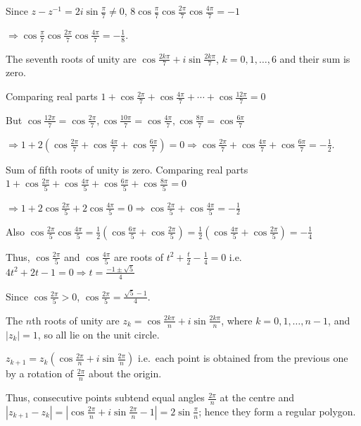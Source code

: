   Since $z - z^{-1} = 2i\sin\frac{\pi}{7}\neq 0$, $8\cos\frac{\pi}{7}\cos\frac{2\pi}{7}\cos\frac{4\pi}{7} =
  -1$

  $\Rightarrow \cos\frac{\pi}{7}\cos\frac{2\pi}{7}\cos\frac{4\pi}{7} = -\frac{1}{8}$.
\item The seventh roots of unity are $\cos\frac{2k\pi}{7} + i\sin\frac{2k\pi}{7}$, $k = 0, 1, \ldots, 6$ and
  their sum is zero.

  Comparing real parts $1 + \cos\frac{2\pi}{7} + \cos\frac{4\pi}{7} + \cdots + \cos\frac{12\pi}{7} = 0$

  But $\cos\frac{12\pi}{7} = \cos\frac{2\pi}{7}, \cos\frac{10\pi}{7} = \cos\frac{4\pi}{7}, \cos\frac{8\pi}{7}
  = \cos\frac{6\pi}{7}$

  $\Rightarrow 1 + 2\left(\cos\frac{2\pi}{7} + \cos\frac{4\pi}{7} + \cos\frac{6\pi}{7}\right) = 0
  \Rightarrow \cos\frac{2\pi}{7} + \cos\frac{4\pi}{7} + \cos\frac{6\pi}{7} = -\frac{1}{2}$.
\item Sum of fifth roots of unity is zero. Comparing real parts $1 + \cos\frac{2\pi}{5} + \cos\frac{4\pi}{5}
  + \cos\frac{6\pi}{5} + \cos\frac{8\pi}{5} = 0$

  $\Rightarrow 1 + 2\cos\frac{2\pi}{5} + 2\cos\frac{4\pi}{5} = 0 \Rightarrow \cos\frac{2\pi}{5} +
  \cos\frac{4\pi}{5} = -\frac{1}{2}$

  Also $\cos\frac{2\pi}{5}\cos\frac{4\pi}{5} = \frac{1}{2}\left(\cos\frac{6\pi}{5} +
  \cos\frac{2\pi}{5}\right) = \frac{1}{2}\left(\cos\frac{4\pi}{5} + \cos\frac{2\pi}{5}\right) =
  -\frac{1}{4}$

  Thus, $\cos\frac{2\pi}{5}$ and $\cos\frac{4\pi}{5}$ are roots of $t^2 + \frac{t}{2} - \frac{1}{4} = 0$ i.e.
  $4t^2 + 2t - 1 = 0 \Rightarrow t = \frac{-1\pm\sqrt{5}}{4}$

  Since $\cos\frac{2\pi}{5} > 0$, $\cos\frac{2\pi}{5} = \frac{\sqrt{5} - 1}{4}$.
\item The $n$th roots of unity are $z_k = \cos\frac{2k\pi}{n} + i\sin\frac{2k\pi}{n}$, where $k = 0, 1,
  \ldots, n - 1$, and $|z_k| = 1$, so all lie on the unit circle.

  $z_{k + 1} = z_k\left(\cos\frac{2\pi}{n} + i\sin\frac{2\pi}{n}\right)$ i.e.\ each point is obtained from the
  previous one by a rotation of $\frac{2\pi}{n}$ about the origin.

  Thus, consecutive points subtend equal angles $\frac{2\pi}{n}$ at the centre and $|z_{k + 1} - z_k| =
  \left|\cos\frac{2\pi}{n} + i\sin\frac{2\pi}{n} - 1\right| = 2\sin\frac{\pi}{n}$; hence they form a regular
  polygon.

